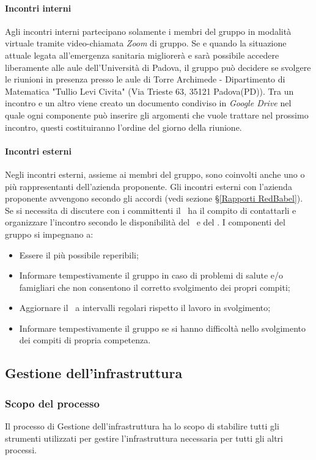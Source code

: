 \paragraph*{Incontri interni}
Agli incontri interni partecipano solamente i membri del gruppo in modalità virtuale tramite video-chiamata \textit{Zoom} di gruppo.
Se e quando la situazione attuale legata all'emergenza sanitaria migliorerà e sarà possibile accedere liberamente alle aule dell'Università di Padova, il gruppo può decidere se svolgere le riunioni in presenza presso le aule di Torre Archimede - Dipartimento di Matematica "Tullio Levi Civita" (Via Trieste 63, 35121 Padova(PD)).
Tra un incontro e un altro viene creato un documento condiviso in \textit{Google Drive} nel quale ogni componente può inserire gli argomenti che vuole trattare nel prossimo incontro, questi costituiranno l'ordine del giorno della riunione.
\paragraph*{Incontri esterni}
Negli incontri esterni, assieme ai membri del gruppo, sono coinvolti anche uno o più rappresentanti dell'azienda proponente.
Gli incontri esterni con l'azienda proponente avvengono secondo gli accordi (vedi sezione \S\ref{Rapporti RedBabel}). Se si necessita di discutere con i committenti il \Responsabile\ ha il compito di contattarli e organizzare l'incontro secondo le disponibilità del \VT\ e del \CR.
\label{NormeGenerali}
I componenti del gruppo si impegnano a:
\begin{itemize}
	\item Essere il più possibile reperibili;
	\item Informare tempestivamente il gruppo in caso di problemi di salute e/o famigliari che non consentono il corretto svolgimento dei propri compiti;
	\item Aggiornare il \Responsabile\ a intervalli regolari rispetto il lavoro in svolgimento;
	\item Informare tempestivamente il gruppo se si hanno difficoltà nello svolgimento dei compiti di propria competenza.
\end{itemize}

\subsection{Gestione dell'infrastruttura}
\subsubsection{Scopo del processo}\label{PO_GestioneInfrastruttura_Scopo}
Il processo di Gestione dell'infrastruttura ha lo scopo di stabilire tutti gli strumenti utilizzati per gestire l'infrastruttura necessaria per tutti gli altri processi.
